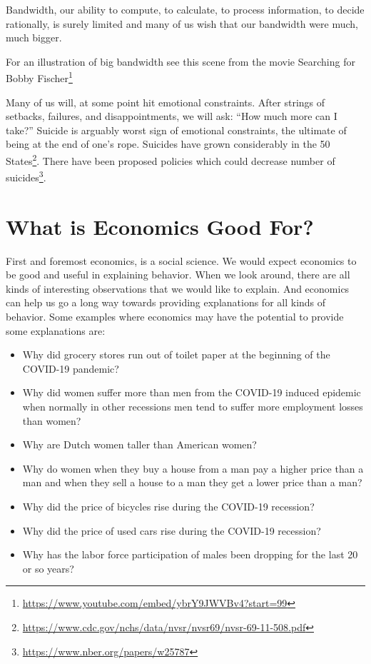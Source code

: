 \documentclass[
]{book}
\providecommand{\tightlist}{%
  \setlength{\itemsep}{0pt}\setlength{\parskip}{0pt}}
\begin{document}
Bandwidth, our ability to compute, to calculate, to process information, to decide rationally, is surely limited and many of us wish that our bandwidth were much, much bigger.

For an illustration of big bandwidth see this scene from the movie Searching for Bobby Fischer\footnote{\url{https://www.youtube.com/embed/ybrY9JWVBv4?start=99}}

Many of us will, at some point hit emotional constraints. After strings of setbacks, failures, and disappointments, we will ask: ``How much more can I take?'' Suicide is arguably worst sign of emotional constraints, the ultimate of being at the end of one's rope. Suicides have grown considerably in the 50 States\footnote{\url{https://www.cdc.gov/nchs/data/nvsr/nvsr69/nvsr-69-11-508.pdf}}. There have been proposed policies which could decrease number of suicides\footnote{\url{https://www.nber.org/papers/w25787}}.

\hypertarget{what-is-economics-good-for}{%
\section{What is Economics Good For?}\label{what-is-economics-good-for}}

First and foremost economics, is a social science. We would expect economics to be good and useful in explaining behavior. When we look around, there are all kinds of interesting observations that we would like to explain. And economics can help us go a long way towards providing explanations for all kinds of behavior. Some examples where economics may have the potential to provide some explanations are:

\begin{itemize}
\tightlist
\item
  Why did grocery stores run out of toilet paper at the beginning of the COVID-19 pandemic?
\item
  Why did women suffer more than men from the COVID-19 induced epidemic when normally in other recessions men tend to suffer more employment losses than women?\\
\item
  Why are Dutch women taller than American women?
\item
  Why do women when they buy a house from a man pay a higher price than a man and when they sell a house to a man they get a lower price than a man?
\item
  Why did the price of bicycles rise during the COVID-19 recession?
\item
  Why did the price of used cars rise during the COVID-19 recession?
\item
  Why has the labor force participation of males been dropping for the last 20 or so years?
\end{itemize}
\end{document}
